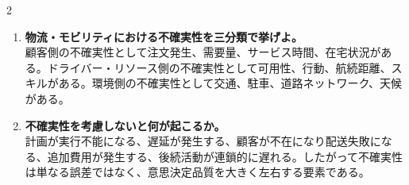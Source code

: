 \begin{multicols}{2}
\begin{enumerate}
\item \textbf{物流・モビリティにおける不確実性を三分類で挙げよ。}\\
顧客側の不確実性として注文発生、需要量、サービス時間、在宅状況がある。ドライバー・リソース側の不確実性として可用性、行動、航続距離、スキルがある。環境側の不確実性として交通、駐車、道路ネットワーク、天候がある。
\item \textbf{不確実性を考慮しないと何が起こるか。}\\
計画が実行不能になる、遅延が発生する、顧客が不在になり配送失敗になる、追加費用が発生する、後続活動が連鎖的に遅れる。したがって不確実性は単なる誤差ではなく、意思決定品質を大きく左右する要素である。
\end{enumerate}

\end{multicols}